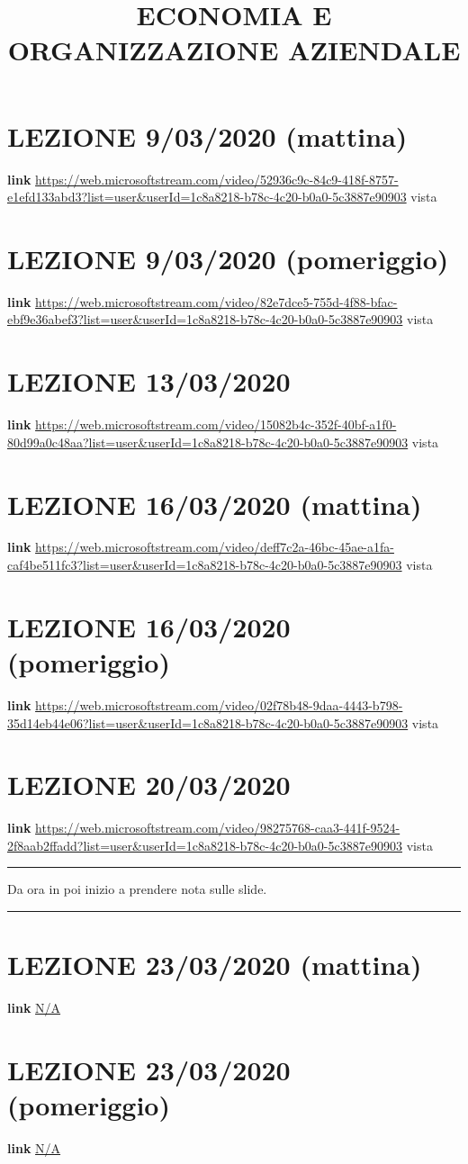 \documentclass[a4paper, 9pt]{article}
\title{ECONOMIA E ORGANIZZAZIONE AZIENDALE}
\begin{document}
\maketitle

\section{LEZIONE 9/03/2020 (mattina)}
\textbf{link} \url{https://web.microsoftstream.com/video/52936c9c-84c9-418f-8757-e1efd133abd3?list=user&userId=1c8a8218-b78c-4c20-b0a0-5c3887e90903} vista
\section{LEZIONE 9/03/2020 (pomeriggio)}
\textbf{link} \url{https://web.microsoftstream.com/video/82e7dce5-755d-4f88-bfac-ebf9e36abef3?list=user&userId=1c8a8218-b78c-4c20-b0a0-5c3887e90903} vista
\section{LEZIONE 13/03/2020}
\textbf{link} \url{https://web.microsoftstream.com/video/15082b4c-352f-40bf-a1f0-80d99a0c48aa?list=user&userId=1c8a8218-b78c-4c20-b0a0-5c3887e90903} vista
\section{LEZIONE 16/03/2020 (mattina)}
\textbf{link} \url{https://web.microsoftstream.com/video/deff7c2a-46bc-45ae-a1fa-caf4be511fc3?list=user&userId=1c8a8218-b78c-4c20-b0a0-5c3887e90903} vista
\section{LEZIONE 16/03/2020 (pomeriggio)}
\textbf{link} \url{https://web.microsoftstream.com/video/02f78b48-9daa-4443-b798-35d14eb44e06?list=user&userId=1c8a8218-b78c-4c20-b0a0-5c3887e90903} vista
\section{LEZIONE 20/03/2020}
\textbf{link} \url{https://web.microsoftstream.com/video/98275768-caa3-441f-9524-2f8aab2ffadd?list=user&userId=1c8a8218-b78c-4c20-b0a0-5c3887e90903} vista
\newline
\rule{\textwidth}{0,4pt}
Da ora in poi inizio a prendere nota sulle slide.\newline
\rule{\textwidth}{0,4pt}
\section{LEZIONE 23/03/2020 (mattina)}
\textbf{link} \url{N/A} 
\section{LEZIONE 23/03/2020 (pomeriggio)}
\textbf{link} \url{N/A} 
\end{document}
